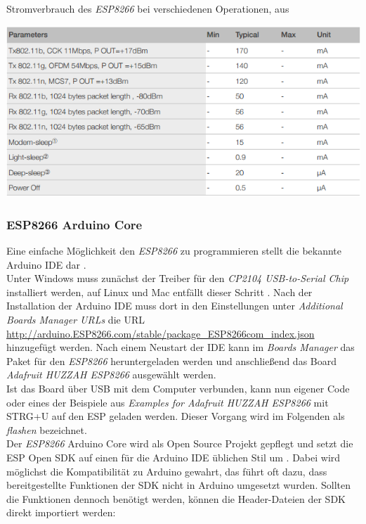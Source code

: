 \begin{table}[h]
  \centering
  \caption{Stromverbrauch des \emph{ESP8266} bei verschiedenen Operationen, aus \cite{espressif2017ESP8266}}
	\includegraphics[width=\textwidth]{images/esppower.png}

  \label{table:esppower}
\end{table}


\subsubsection{ESP8266 Arduino Core}
Eine einfache Möglichkeit den \emph{ESP8266} zu programmieren stellt die bekannte Arduino IDE dar \cite{banzi2017arduino}.\\
Unter Windows muss zunächst der Treiber für den \textit{CP2104 USB-to-Serial Chip} installiert werden, auf Linux und Mac entfällt dieser Schritt \cite{fried2017feather}.
Nach der Installation der Arduino IDE muss dort in den Einstellungen unter \textit{Additional Boards Manager URLs} die URL \url{http://arduino.ESP8266.com/stable/package_ESP8266com_index.json} hinzugefügt werden.  
Nach einem Neustart der IDE kann im \textit{Boards Manager} das Paket für den \emph{ESP8266} heruntergeladen werden und anschließend das Board \textit{Adafruit HUZZAH \emph{ESP8266}} ausgewählt werden. \\
Ist das Board über USB mit dem Computer verbunden, kann nun eigener Code oder eines der Beispiele aus \textit{Examples for Adafruit HUZZAH ESP8266} mit STRG+U auf den ESP geladen werden. 
Dieser Vorgang wird im Folgenden als \emph{flashen} bezeichnet. \\
Der \emph{ESP8266} Arduino Core wird als Open Source Projekt gepflegt und setzt die ESP Open SDK auf einen für die Arduino IDE üblichen Stil um \cite{arduino2017core}. 
Dabei wird möglichst die Kompatibilität zu Arduino gewahrt, das führt oft dazu, dass bereitgestellte Funktionen der SDK nicht in Arduino umgesetzt wurden.
Sollten die Funktionen dennoch benötigt werden, können die Header-Dateien der SDK direkt importiert werden:

